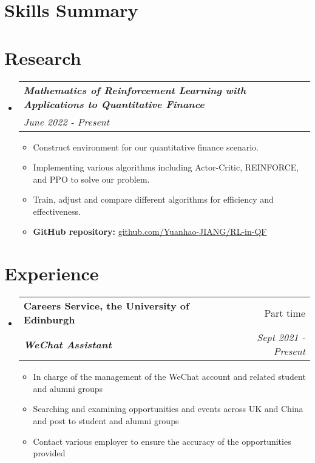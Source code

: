 \documentclass[12pt, a4paper]{article}
\makeatletter
\newcommand{\resumeSection}[1]{
    \section*{#1}
}
\newcommand{\resumeSectionItm}[4]{
\item
    \begin{tabular*}{0.96\textwidth}{@{}l@{\extracolsep{\fill}}r@{}}
        \textbf{#1} & #2 \\
        \textit{\textbf{#3}} & \textit{#4}
    \end{tabular*}
}
\newcommand{\resumeResearchItm}[2]{
\item
    \begin{tabular*}{0.96\textwidth}{@{}l@{\extracolsep{\fill}}r@{}}
        \hspace{-1.5mm}\textit{\textbf{#1}} & \\
        \hspace{0.5mm}\textit{#2} &
    \end{tabular*}
}
\newcommand{\resumeSectionSubItm}[2]{
\item 
    \textbf{\parbox[t]{4.7cm}{#1\hfill}}\parbox[t]{12.5cm}{#2}\vspace{-2mm}
}
\newcommand{\resumeSectionSubItmI}[1]{
\item {#1}\vspace{-2mm}
}
\newcommand{\resumeSectionSubItmII}[2]{
\item \textbf{#1: }{#2}\vspace{-2mm}
}
\makeatother
\begin{document}
\resumeSection{Skills Summary}
\vspace{-2.5mm}

\resumeSection{Research}
\begin{itemize}[leftmargin=*]
    \resumeResearchItm{
        Mathematics of Reinforcement Learning with Applications to 
        Quantitative Finance
    }{June 2022 - Present}
    \vspace{-2mm}
    \begin{itemize}[leftmargin=*]
        \resumeSectionSubItmI{
            Construct environment for our quantitative finance scenario.
        }
        \resumeSectionSubItmI{
            Implementing various algorithms including Actor-Critic, REINFORCE,
            and PPO to solve our problem. 
        }
        \resumeSectionSubItmI{
            Train, adjust and compare different algorithms for efficiency and
            effectiveness.
        }
        \resumeSectionSubItmII{GitHub repository}{
        \href{https://github.com/Yuanhao-JIANG/RL-in-QF}
        {github.com/Yuanhao-JIANG/RL-in-QF}}
    \end{itemize}
\end{itemize}
\vspace{-3mm}

\resumeSection{Experience}
\begin{itemize}[leftmargin=*]
    \resumeSectionItm
    {Careers Service, the University of Edinburgh}{Part time}
    {WeChat Assistant}{Sept 2021 - Present}
    \vspace{-2mm}
    \begin{itemize}[leftmargin=*]
        \resumeSectionSubItmI{
            In charge of the management of the WeChat account and related 
            student and alumni groups
        }
        \resumeSectionSubItmI{
            Searching and examining opportunities and events across UK and 
            China and post to student and alumni groups
        }
        \resumeSectionSubItmI{
            Contact various employer to ensure the accuracy of the 
            opportunities provided
        }
    \end{itemize}
\end{itemize}
\vspace{-3mm}
\end{document}
